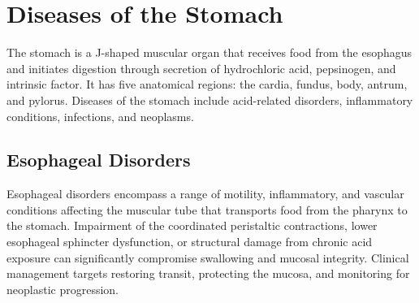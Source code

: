 \chapter{Diseases of the Stomach}
\label{ch:stomach}
The stomach is a J-shaped muscular organ that receives food from the esophagus and initiates digestion through secretion of hydrochloric acid, pepsinogen, and intrinsic factor. It has five anatomical regions: the cardia, fundus, body, antrum, and pylorus. Diseases of the stomach include acid-related disorders, inflammatory conditions, infections, and neoplasms.

\section{Esophageal Disorders}




Esophageal disorders encompass a range of motility, inflammatory, and vascular conditions affecting the muscular tube that transports food from the pharynx to the stomach. Impairment of the coordinated peristaltic contractions, lower esophageal sphincter dysfunction, or structural damage from chronic acid exposure can significantly compromise swallowing and mucosal integrity. Clinical management targets restoring transit, protecting the mucosa, and monitoring for neoplastic progression.





\label{sec:section:Esophageal Disorders}

